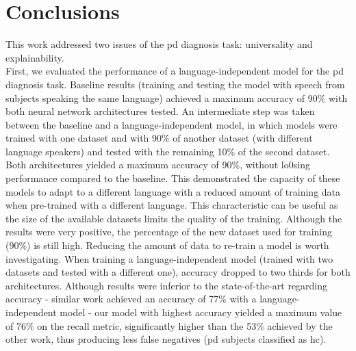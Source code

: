 
\chapter{Conclusions}
\label{ch:magna}


This work addressed two issues of the \gls{pd} diagnosis task: universality and explainability. \\
First, we evaluated the performance of a language-independent model for the \gls{pd} diagnosis task. Baseline results (training and testing the model with speech from subjects speaking the same language) achieved a maximum accuracy of 90\% with both neural network architectures tested. An intermediate step was taken between the baseline and a language-independent model, in which models were trained with one dataset and with 90\% of another dataset (with different language speakers) and tested with the remaining 10\% of the second dataset. Both architectures yielded a maximum accuracy of 90\%, without lo0sing performance compared to the baseline. This demonstrated the capacity of these models to adapt to a different language with a reduced amount of training data when pre-trained with a different language. This characteristic can be useful as the size of the available datasets limits the quality of the training. Although the results were very positive, the percentage of the new dataset used for training (90\%) is still high. Reducing the amount of data to re-train a model is worth investigating. When training a language-independent model (trained with two datasets and tested with a different one), accuracy dropped to two thirds for both architectures. Although results were inferior to the state-of-the-art regarding accuracy - similar work achieved an accuracy of 77\% with a language-independent model \cite{parkinson_three_languages} - our model with highest accuracy yielded a maximum value of 76\% on the recall metric, significantly higher than the 53\% achieved by the other work, thus producing less false negatives (\gls{pd} subjects classified as \gls{hc}). \\
